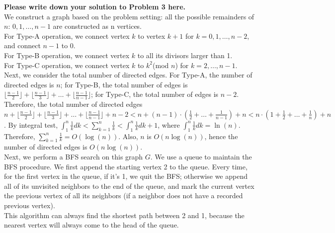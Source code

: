 \documentclass[11pt,twoside]{article}
\newenvironment{solution}{{\par\noindent\it Solution.}}{}
\begin{document}
\begin{solution}
\textbf{Please write down your solution to Problem 3 here.}
\vspace{10pt}\\
We construct a graph based on the problem setting: all the possible remainders of $n$: $0,1,\dots,n-1$ are constructed as n vertices.
\vspace{10pt}\\
For Type-A operation, we connect vertex $k$ to vertex $k+1$ for $k=0,1,\dots,n-2$, and connect $n-1$ to 0.
\vspace{10pt}\\
For Type-B operation, we connect vertex $k$ to all its divisors larger than 1.
\vspace{10pt}\\
For Type-C operation, we connect vertex $k$ to $k^2$(mod $n$) for $k=2,\dots,n-1$.
\vspace{10pt}\\
Next, we consider the total number of directed edges. For Type-A, the number of directed edges is $n$;
for Type-B, the total number of edges is $\lfloor\frac{n-1}{2}\rfloor+\lfloor\frac{n-1}{3}\rfloor+\dots+\lfloor\frac{n-1}{n-1}\rfloor$;
for Type-C, the total number of edges is $n-2$. 
\vspace{10pt}\\
Therefore, the total number of directed edges $n+\lfloor\frac{n-1}{2}\rfloor+\lfloor\frac{n-1}{3}\rfloor+\dots+\lfloor\frac{n-1}{n-1}\rfloor+n-2
<n+(n-1)\cdot(\frac{1}{2}+\dots+\frac{1}{n-1})+n<n\cdot(1+\frac{1}{2}+\dots+\frac{1}{n})+n$.
By integral test, $\int_{1}^{n}\frac{1}{k}dk<\sum_{k=1}^{n}\frac{1}{k}<\int_{1}^{n}\frac{1}{k}dk+1$, where $\int_{1}^{n}\frac{1}{k}dk=\ln(n)$.
Therefore, $\sum_{k=1}^{n}\frac{1}{k}=O(\log(n))$. Also, $n$ is $O(n\log(n))$, hence the number of directed edges is $O(n\log(n))$.
\vspace{10pt}\\
Next, we perform a BFS search on this graph $G$. We use a queue to maintain the BFS procedure. 
We first append the starting vertex 2 to the queue. 
Every time, for the first vertex in the queue, if it's 1, we quit the BFS; otherwise we append all of its unvisited neighbors to the end of the queue,
and mark the current vertex the previous vertex of all its neighbors (if a neighbor does not have a recorded previous vertex).
\vspace{10pt}\\
This algorithm can always find the shortest path between 2 and 1, because the nearest vertex will always come to the head of the queue.

\end{solution}
\end{document}

